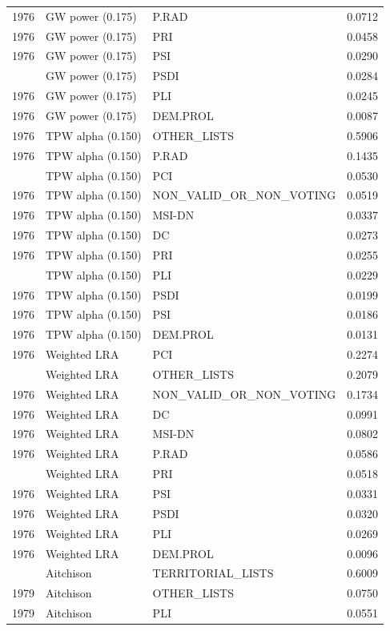 \begin{longtable}[t]{rllr}
1976 & GW power (0.175) & P.RAD & 0.0712\\
1976 & GW power (0.175) & PRI & 0.0458\\
1976 & GW power (0.175) & PSI & 0.0290\\
\addlinespace
1976 & GW power (0.175) & PSDI & 0.0284\\
1976 & GW power (0.175) & PLI & 0.0245\\
1976 & GW power (0.175) & DEM.PROL & 0.0087\\
1976 & TPW alpha (0.150) & OTHER\_LISTS & 0.5906\\
1976 & TPW alpha (0.150) & P.RAD & 0.1435\\
\addlinespace
1976 & TPW alpha (0.150) & PCI & 0.0530\\
1976 & TPW alpha (0.150) & NON\_VALID\_OR\_NON\_VOTING & 0.0519\\
1976 & TPW alpha (0.150) & MSI-DN & 0.0337\\
1976 & TPW alpha (0.150) & DC & 0.0273\\
1976 & TPW alpha (0.150) & PRI & 0.0255\\
\addlinespace
1976 & TPW alpha (0.150) & PLI & 0.0229\\
1976 & TPW alpha (0.150) & PSDI & 0.0199\\
1976 & TPW alpha (0.150) & PSI & 0.0186\\
1976 & TPW alpha (0.150) & DEM.PROL & 0.0131\\
1976 & Weighted LRA & PCI & 0.2274\\
\addlinespace
1976 & Weighted LRA & OTHER\_LISTS & 0.2079\\
1976 & Weighted LRA & NON\_VALID\_OR\_NON\_VOTING & 0.1734\\
1976 & Weighted LRA & DC & 0.0991\\
1976 & Weighted LRA & MSI-DN & 0.0802\\
1976 & Weighted LRA & P.RAD & 0.0586\\
\addlinespace
1976 & Weighted LRA & PRI & 0.0518\\
1976 & Weighted LRA & PSI & 0.0331\\
1976 & Weighted LRA & PSDI & 0.0320\\
1976 & Weighted LRA & PLI & 0.0269\\
1976 & Weighted LRA & DEM.PROL & 0.0096\\
\addlinespace
1979 & Aitchison & TERRITORIAL\_LISTS & 0.6009\\
1979 & Aitchison & OTHER\_LISTS & 0.0750\\
1979 & Aitchison & PLI & 0.0551\\

\end{longtable}
